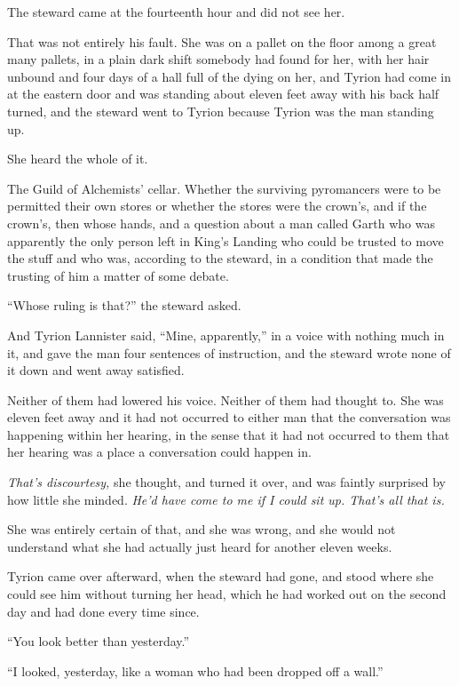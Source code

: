 \sceneBreak

The steward came at the fourteenth hour and did not see her.

That was not entirely his fault. She was on a pallet on the floor among a great many pallets, in a plain dark shift somebody had found for her, with her hair unbound and four days of a hall full of the dying on her, and Tyrion had come in at the eastern door and was standing about eleven feet away with his back half turned, and the steward went to Tyrion because Tyrion was the man standing up.

She heard the whole of it.

The Guild of Alchemists’ cellar. Whether the surviving pyromancers were to be permitted their own stores or whether the stores were the crown’s, and if the crown’s, then whose hands, and a question about a man called Garth who was apparently the only person left in King’s Landing who could be trusted to move the stuff and who was, according to the steward, in a condition that made the trusting of him a matter of some debate.

“Whose ruling is that?” the steward asked.

And Tyrion Lannister said, “Mine, apparently,” in a voice with nothing much in it, and gave the man four sentences of instruction, and the steward wrote none of it down and went away satisfied.

Neither of them had lowered his voice. Neither of them had thought to. She was eleven feet away and it had not occurred to either man that the conversation was happening within her hearing, in the sense that it had not occurred to them that her hearing was a place a conversation could happen in.

\textit{That’s discourtesy,} she thought, and turned it over, and was faintly surprised by how little she minded. \textit{He’d have come to me if I could sit up. That’s all that is.}

She was entirely certain of that, and she was wrong, and she would not understand what she had actually just heard for another eleven weeks.

\sceneBreak

Tyrion came over afterward, when the steward had gone, and stood where she could see him without turning her head, which he had worked out on the second day and had done every time since.

“You look better than yesterday.”

“I looked, yesterday, like a woman who had been dropped off a wall.”

